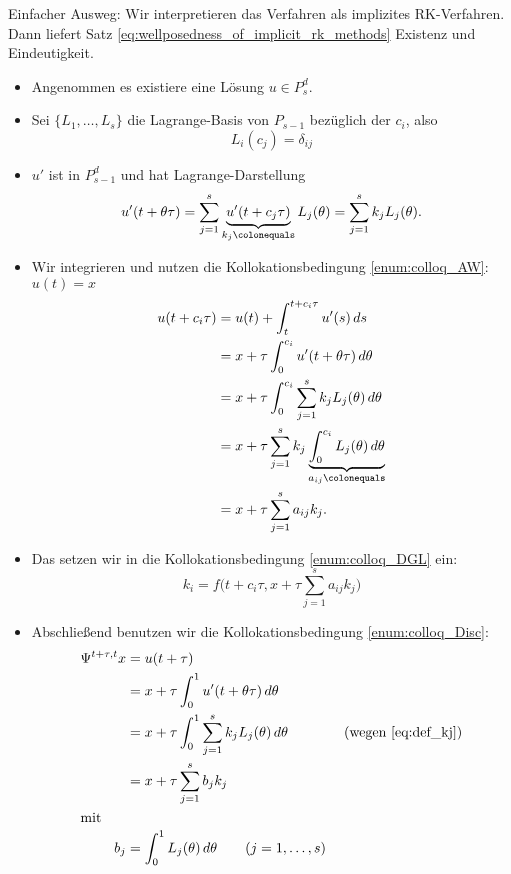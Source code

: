 Einfacher Ausweg: Wir interpretieren das Verfahren als implizites RK-Verfahren. Dann liefert Satz \ref{eq:wellposedness_of_implicit_rk_methods} Existenz und Eindeutigkeit.
\begin{itemize}
	\item Angenommen es existiere eine Lösung $u \in P^d_s$.
	\item Sei $\{ L_1, \dots, L_s\}$ die Lagrange-Basis von $P_{s-1}$ bezüglich der $c_i$, also
	\begin{equation*}
		L_i(c_j) = \delta_{ij} \tag{$i,j = 1, \dots, s$}
	\end{equation*}
	\item $u'$ ist in $P_{s-1}^d$ und hat Lagrange-Darstellung
		\begin{equation} \label{eq:def_kj}
			u'(t+ \theta \tau) = \sum_{j=1}^{s} \underbrace{u'(t + c_j \tau)}_{k_j \colonequals} L_j(\theta) =  \sum_{j=1}^{s} k_j L_j(\theta).
		\end{equation}
	\item Wir integrieren und nutzen die Kollokationsbedingung \ref{enum:colloq_AW}: $u(t) = x$
	\begin{align*}
		u(t+c_i \tau) &= u(t) + \int_{t}^{t+c_i\tau} u'(s) \, ds \\
			&= x + \tau \int_{0}^{c_i} u'(t + \theta \tau) \, d\theta \\
			&= x + \tau \int_{0}^{c_i} \sum_{j=1}^s k_j L_j(\theta) \, d\theta \\
			&= x + \tau \sum_{j=1}^{s} k_j \underbrace{\int_{0}^{c_i} L_j(\theta)
			 \, d\theta}_{a_{ij} \colonequals} \\
			&= x + \tau  \sum_{j=1}^{s} a_{ij} k_j. 
	\end{align*}
	\item Das setzen wir in die Kollokationsbedingung \ref{enum:colloq_DGL} ein:
	\begin{equation*}
		 k_i = f\Big(t + c_i \tau, x + \tau  \sum_{j=1}^{s} a_{ij} k_j \Big) \tag{$i=1,\dots,s$}
	\end{equation*}
	\item Abschließend benutzen wir die Kollokationsbedingung \ref{enum:colloq_Disc}:
	\begin{align*}
		\Psi^{t+\tau, t} x &= u(t + \tau) \\
			&= x + \tau \int_0^1 u'(t + \theta \tau) \, d\theta \\
			&= x + \tau \int_0^1  \sum_{j=1}^{s} k_j L_j(\theta) \, d\theta \qquad \tag{wegen \eqref{eq:def_kj}} \\
			&= x + \tau \sum_{j=1}^{s} b_j k_j \\
		\intertext{mit}
		b_j &=  \int_0^1  L_j(\theta) \, d\theta  \tag{$j = 1,\dots,s$}
	\end{align*}
\end{itemize}
